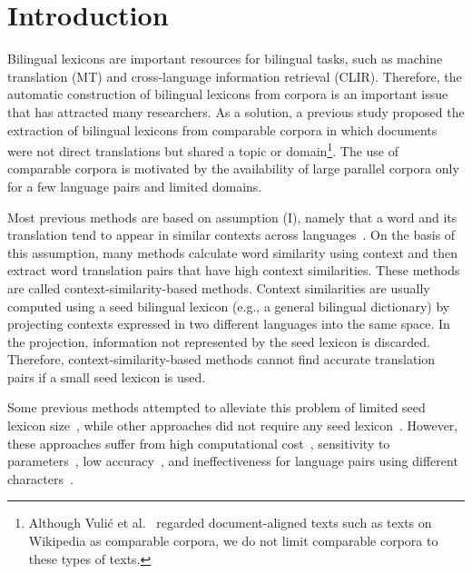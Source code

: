 \documentclass[english]{jnlp_1.4}
\begin{document}
\maketitle

\section{Introduction}

\vspace{-0.5\Cvs}
Bilingual lexicons are important resources for bilingual tasks, such as machine translation (MT) and cross-language information retrieval (CLIR). 
Therefore, the automatic construction of bilingual lexicons from corpora is an important issue that has attracted many researchers. 
As a solution, a previous study proposed the extraction of bilingual lexicons from comparable corpora in which documents were not direct translations but shared a topic or domain\footnote{Although Vuli{\'{c}} et al.~\citeyear{ivan11} regarded document-aligned texts such as texts on Wikipedia as comparable corpora, we do not limit comparable corpora to these types of texts.}. 
The use of comparable corpora is motivated by the availability of large parallel corpora only for a few language pairs and limited domains. 

Most previous methods are based on assumption (I), namely that a word and its translation tend to appear in similar contexts across languages~\cite{rapp99}. 
On the basis of this assumption, many methods calculate word similarity using context and then extract word translation pairs that have high context similarities. 
These methods are called context-similarity-based methods. 
Context similarities are usually computed using a seed bilingual lexicon (e.g., a general bilingual dictionary) by projecting contexts expressed in two different languages into the same space. 
In the projection, information not represented by the seed lexicon is discarded. 
Therefore, context-similarity-based methods cannot find accurate translation pairs if a small seed lexicon is used. 

Some previous methods attempted to alleviate this problem of limited seed lexicon size~\cite{koehn02,morin11,hazem11}, while other approaches did not require any seed lexicon~\cite{rapp95,fung95,haghighi08,ismail10,hal11}. 
However, these approaches suffer from high computational cost~\cite{rapp95}, sensitivity to parameters~\cite{hazem11}, low accuracy~\cite{fung95,ismail10}, and ineffectiveness for language pairs using different characters~\cite{koehn02,haghighi08,hal11}. 
\end{document}
